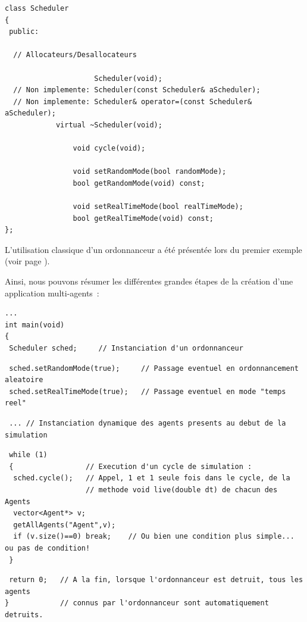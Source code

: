 \documentclass[12pt]{article}
\begin{document}
\begin{footnotesize}
\begin{verbatim}
class Scheduler
{
 public:

  // Allocateurs/Desallocateurs

                     Scheduler(void);
  // Non implemente: Scheduler(const Scheduler& aScheduler);
  // Non implemente: Scheduler& operator=(const Scheduler& aScheduler);
            virtual ~Scheduler(void);

                void cycle(void);

                void setRandomMode(bool randomMode);
                bool getRandomMode(void) const;

                void setRealTimeMode(bool realTimeMode);
                bool getRealTimeMode(void) const;
};
\end{verbatim}
\end{footnotesize}

L'utilisation classique d'un ordonnanceur a \'et\'e pr\'esent\'ee
lors du premier exemple (voir page \pageref{premierEx}).

\newpage

Ainsi, nous pouvons r\'esumer les diff\'erentes grandes \'etapes
de la cr\'eation d'une application multi-agents~:

\vspace{-0.3cm}
\begin{footnotesize}
\begin{verbatim}
...
int main(void)
{
 Scheduler sched;     // Instanciation d'un ordonnanceur
\end{verbatim}
\begin{verbatim}
 sched.setRandomMode(true);     // Passage eventuel en ordonnancement aleatoire
 sched.setRealTimeMode(true);   // Passage eventuel en mode "temps reel"
\end{verbatim}
\vspace{-0.8cm}
\begin{verbatim}
 ... // Instanciation dynamique des agents presents au debut de la simulation
\end{verbatim}
\vspace{-0.8cm}
\begin{verbatim}
 while (1)
 {                 // Execution d'un cycle de simulation :
  sched.cycle();   // Appel, 1 et 1 seule fois dans le cycle, de la
                   // methode void live(double dt) de chacun des Agents
  vector<Agent*> v;
  getAllAgents("Agent",v);
  if (v.size()==0) break;    // Ou bien une condition plus simple... ou pas de condition!
 }
\end{verbatim}
\vspace{-0.8cm}
\begin{verbatim}
 return 0;   // A la fin, lorsque l'ordonnanceur est detruit, tous les agents
}            // connus par l'ordonnanceur sont automatiquement detruits.
\end{verbatim}
\end{footnotesize}
\end{document}
